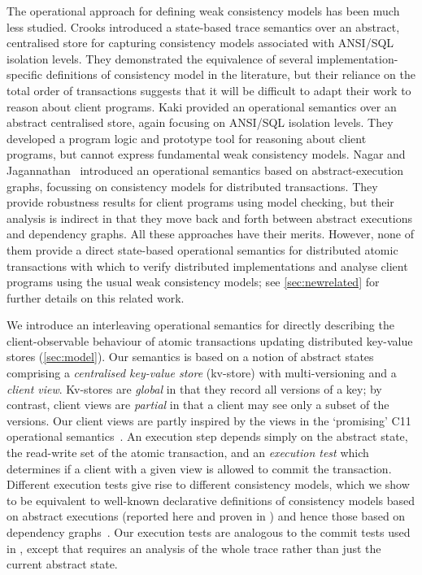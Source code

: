 The operational approach for defining weak consistency models has been
much less studied.  Crooks \etal\citet{seebelieve} introduced
a {state-based} trace semantics over an abstract, centralised store for
capturing consistency models associated with ANSI/SQL isolation
levels. They demonstrated the equivalence of several
implementation-specific definitions of consistency model in the
literature, but their reliance on the total order of transactions
suggests that it will be difficult to adapt their work to reason about
client programs.  Kaki \etal\citet{alonetogether} provided an
operational semantics over an abstract centralised store, again
focusing on ANSI/SQL isolation levels. They developed a program logic
and prototype tool for reasoning about client programs, but cannot
express fundamental weak consistency models. Nagar and Jagannathan~\cite{sureshConcur} introduced an operational semantics based on
abstract-execution graphs, focussing on consistency models for
distributed transactions. They provide robustness results for client
programs using model checking, but their analysis is indirect in that
they move back and forth between abstract executions and dependency
graphs. All these approaches have their merits. However, none of them
provide a direct state-based operational semantics for distributed
atomic transactions with which to verify distributed implementations
and analyse client programs using the usual weak consistency models; 
see \cref{sec:newrelated} for further details on this related work. 



We introduce an interleaving operational semantics for directly describing the
client-observable behaviour of atomic transactions 
updating distributed key-value stores  (\cref{sec:model}). Our semantics is
based on a notion of abstract states comprising a \emph{centralised key-value store} (kv-store) with {multi-versioning} and a \emph{client view}.
Kv-stores are {\em global} in that they record all versions of a key; 
by contrast, client views are {\em partial} in that a client may see only a subset of the versions. 
Our client views are partly inspired by the views in the `promising' C11 operational semantics~\cite{promises}. 
An execution step depends simply on the abstract state, the read-write set of the atomic transaction, and an \emph{execution test} which
determines if a client with a given view is allowed to commit the transaction. Different execution tests give rise to different
consistency models, 
which we show to be equivalent to well-known
declarative definitions of consistency models based on abstract executions 
(reported here and proven in \cite{shale-phd}) and hence those based on dependency graphs~\cite{laws}. 
Our execution tests are analogous to the commit tests used in \cite{seebelieve},
except that \cite{seebelieve}  requires an analysis of the whole
trace rather than just the  current abstract state. 

